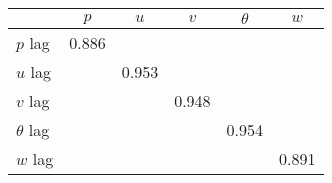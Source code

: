 \begin{tabular}{l*{5}{c}}
\toprule
                &\multicolumn{1}{c}{$ p $}&\multicolumn{1}{c}{$ u $}&\multicolumn{1}{c}{$ v $}&\multicolumn{1}{c}{$ \theta $}&\multicolumn{1}{c}{$ w $}\\
\midrule
$ p $ lag       &    0.886&         &         &         &         \\
$ u $ lag       &         &    0.953&         &         &         \\
$ v $ lag       &         &         &    0.948&         &         \\
$ \theta $ lag  &         &         &         &    0.954&         \\
$ w $ lag       &         &         &         &         &    0.891\\
\bottomrule
\end{tabular}
